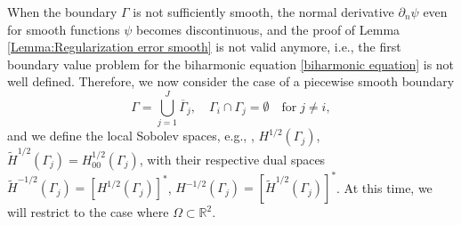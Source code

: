 \documentclass{article}
\numberwithin{equation}{section}
\begin{document}
\noindent
When the boundary $\Gamma$ is not sufficiently smooth, the
normal derivative $\partial_n \psi$
even for smooth functions $\psi$ becomes discontinuous, and the
proof of Lemma \ref{Lemma:Regularization error smooth} is not valid anymore,
i.e., the first boundary value problem for the biharmonic equation
\eqref{biharmonic equation} is not well defined.
Therefore, we now consider the case of a piecewise smooth boundary
\begin{equation}\label{pw boundary}
  \Gamma = \bigcup\limits_{j=1}^J \overline{\Gamma}_j, \quad
  \Gamma_i \cap \Gamma_j = \emptyset \quad
  \mbox{for} \; j \neq i ,
\end{equation}
and we define the local Sobolev spaces, e.g., \cite{McLean2000},
$H^{1/2}(\Gamma_j)$, $\widetilde{H}^{1/2}(\Gamma_j) = H^{1/2}_{00}(\Gamma_j)$,
with their respective dual spaces
$\widetilde{H}^{-1/2}(\Gamma_j) = [H^{1/2}(\Gamma_j)]^*$,
$H^{-1/2}(\Gamma_j) = [\widetilde{H}^{1/2}(\Gamma_j)]^*$.
At this time, we will restrict to the case where
$\Omega\subset \mathbb{R}^2$.
\end{document}

